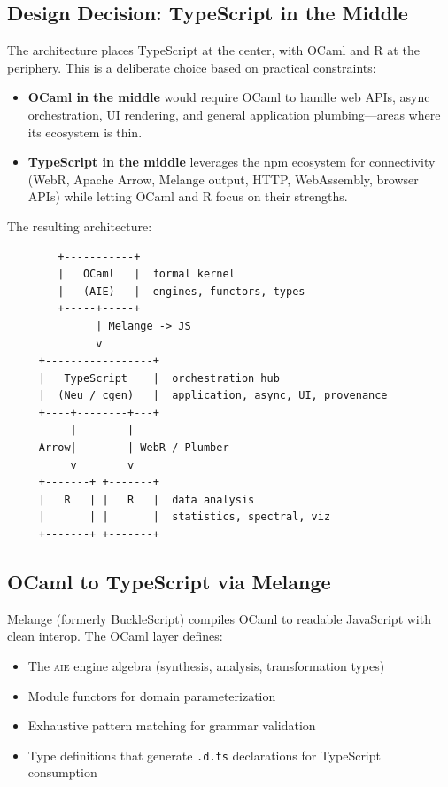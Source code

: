 \documentclass[11pt,letterpaper]{article}
\newcommand{\aie}{\textsc{aie}}
\begin{document}
\subsection{Design Decision: TypeScript in the Middle}

The architecture places TypeScript at the center, with OCaml and R at the periphery. This is a deliberate choice based on practical constraints:

\begin{itemize}[leftmargin=*]
  \item \textbf{OCaml in the middle} would require OCaml to handle web APIs, async orchestration, UI rendering, and general application plumbing---areas where its ecosystem is thin.
  \item \textbf{TypeScript in the middle} leverages the npm ecosystem for connectivity (WebR, Apache Arrow, Melange output, HTTP, WebAssembly, browser APIs) while letting OCaml and R focus on their strengths.
\end{itemize}

The resulting architecture:

\begin{verbatim}
        +-----------+
        |   OCaml   |  formal kernel
        |   (AIE)   |  engines, functors, types
        +-----+-----+
              | Melange -> JS
              v
     +-----------------+
     |   TypeScript    |  orchestration hub
     |  (Neu / cgen)   |  application, async, UI, provenance
     +----+--------+---+
          |        |
     Arrow|        | WebR / Plumber
          v        v
     +-------+ +-------+
     |   R   | |   R   |  data analysis
     |       | |       |  statistics, spectral, viz
     +-------+ +-------+
\end{verbatim}

\subsection{OCaml to TypeScript via Melange}

Melange (formerly BuckleScript) compiles OCaml to readable JavaScript with clean interop. The OCaml layer defines:

\begin{itemize}[leftmargin=*]
  \item The \aie{} engine algebra (synthesis, analysis, transformation types)
  \item Module functors for domain parameterization
  \item Exhaustive pattern matching for grammar validation
  \item Type definitions that generate \texttt{.d.ts} declarations for TypeScript consumption
\end{itemize}
\end{document}
